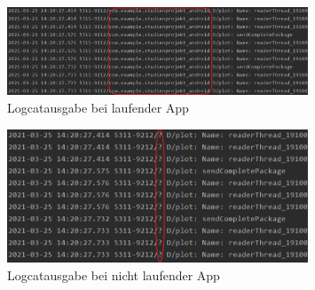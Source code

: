 \documentclass[12pt, onecolumn, notitlepage]{scrartcl}
\begin{document}
\begin{figure}[htbp] 
	\centering
	\includegraphics[width=0.8\textwidth]{Logcat_laufend.PNG}
	\caption{Logcatausgabe bei laufender App}
\end{figure}

\begin{figure}[htbp] 
	\centering
	\includegraphics[width=0.8\textwidth]{Logcat_nichtLaufend.PNG}
	\caption{Logcatausgabe bei nicht laufender App}
\end{figure}
\end{document}
